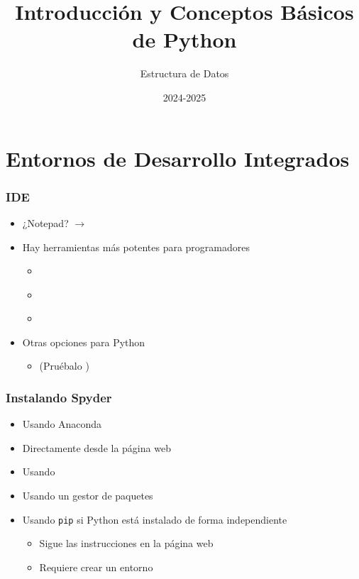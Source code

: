 \documentclass[11pt]{beamer}
\author{Estructura de Datos}
\title{\huge{Introducción y Conceptos Básicos \\de Python}}
\date[]{2024-2025}
\begin{document}
\begin{frame}[plain]
	\maketitle
\end{frame}

\begin{frame}
	\tableofcontents
\end{frame}

\section{Entornos de Desarrollo Integrados}

\begin{frame}\frametitle{IDE}
\begin{itemize}
\item ¿Notepad? $\rightarrow$ \href{https://notepad-plus-plus.org/}{}
\item Hay herramientas más potentes para programadores
    \begin{itemize}
    \item \href{https://docs.python.org/3/library/idle.html}{}
    \item \href{https://www.spyder-ide.org/}{}
    \item \href{https://www.jetbrains.com/pycharm/}{}
    \end{itemize}
\item Otras opciones para Python
    \begin{itemize}
    \item \href{https://jupyter.org/install}{} (Pruébalo \href{https://jupyter.org/try-jupyter/lab/?path=notebooks\%2FIntro.ipynb}{})
    \end{itemize}
\end{itemize}
\end{frame}

\begin{frame}\frametitle{Instalando Spyder}
\begin{itemize}
\item Usando Anaconda
\item Directamente desde la página web
\item Usando \href{https://winpython.github.io/}{}
\item Usando un gestor de paquetes
\item Usando \lstinline|pip| si Python está instalado de forma independiente
    \begin{itemize}
        \item Sigue las instrucciones en la página web
        \item Requiere crear un entorno
    \end{itemize}
\end{itemize}
\end{frame}
\end{document}
